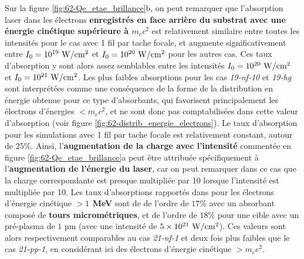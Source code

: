 \begin{refsection}
Sur la figure \ref{fig:62-Qe_etae_brillance}b, on peut remarquer que l'absorption laser dans les électrons \textbf{enregistrés en face arrière du substrat avec une énergie cinétique supérieure à $m_ec^2$} est relativement similaire entre toutes les intensités pour le cas avec 1 fil par tache focale, et augmente significativement entre $I_0 = 10^{19} ~ \rm W/cm^2$ et $I_0 = 10^{20} ~ \rm W/cm^2$ pour les autres cas. Ces taux d'absorption y sont alors assez semblables entre les intensités $I_0 = 10^{20} ~ \rm W/cm^2$ et $I_0 = 10^{21} ~ \rm W/cm^2$. Les plus faibles absorptions pour les cas \textit{19-nf-10} et \textit{19-hg} sont interprétées comme une conséquence de la forme de la distribution en énergie obtenue pour ce type d'absorbants, qui favorisent principalement les électrons d'énergies $<m_e c^2$, et ne sont donc pas comptabilisées dans cette valeur d'absorption (voir figure \ref{fig:62-distrib_energie_electrons}). 
Le taux d'absorption pour les simulations avec 1 fil par tache focale est relativement constant, autour de $25 \%$. Ainsi, l'\textbf{augmentation de la charge avec l'intensité} commentée en figure \ref{fig:62-Qe_etae_brillance}a peut être attribuée spécifiquement à l'\textbf{augmentation de l'énergie du laser}, car on peut remarquer dans ce cas que la charge correspondante est presque multipliée par 10 lorsque l'intensité est multipliée par 10. Les taux d'absorptions rapportés dans \cite{jiang_2014} pour les électrons d'énergie cinétique \textbf{$>1$ MeV} sont de de l'ordre de $17 \%$ avec un absorbant composé de \textbf{tours micrométriques}, et de l'ordre de $18\%$ pour une cible avec un pré-plasma de $1$ µm (avec une intensité de $5 \times 10^{21} ~ \rm W/cm^2$). Ces valeurs sont alors respectivement comparables au cas \textit{21-nf-1} et deux fois plus faibles que le cas \textit{21-pp-1}, en considérant ici des électrons d'énergie cinétique $>m_ec^2$.


\end{refsection}

